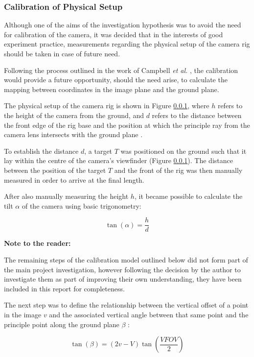 \subsubsection{Calibration of Physical Setup}

Although one of the aims of the investigation hypothesis was to avoid the need for calibration of the camera, it was decided that in the interests of good experiment practice, measurements regarding the physical setup of the camera rig should be taken in case of future need. 

Following the process outlined in the work of Campbell \textit{et al.} \cite{campbell}, the calibration would provide a future opportunity, should the need arise, to calculate the mapping between coordinates in the image plane and the ground plane.

The physical setup of the camera rig is shown in Figure \ref{}, where $h$ refers to the height of the camera from the ground, and $d$ refers to the distance between the front edge of the rig base and the position at which the principle ray from the camera lens intersects with the ground plane \cite{campbell}.

To establish the distance $d$, a target $T$ was positioned on the ground such that it lay within the centre of the camera's viewfinder (Figure \ref{}). The distance between the position of the target $T$ and the front of the rig was then manually measured in order to arrive at the final length. 

After also manually measuring the height $h$, it became possible to calculate the tilt $ \alpha $ of the camera using basic trigonometry:

\begin{equation}
	\tan(\alpha) = \frac{h}{d}
\end{equation}

\textbf{Note to the reader:}

The remaining steps of the calibration model outlined below did not form part of the main project investigation, however following the decision by the author to investigate them as part of improving their own understanding, they have been included in this report for completeness.

The next step was to define the relationship between the vertical offset of a point in the image $v$ and the associated vertical angle between that same point and the principle point along the ground plane $\beta$ \cite{campbell}:

\begin{equation}
	\tan(\beta) = (2v - V)\tan(\frac{VFOV}{2})
\end{equation}  


